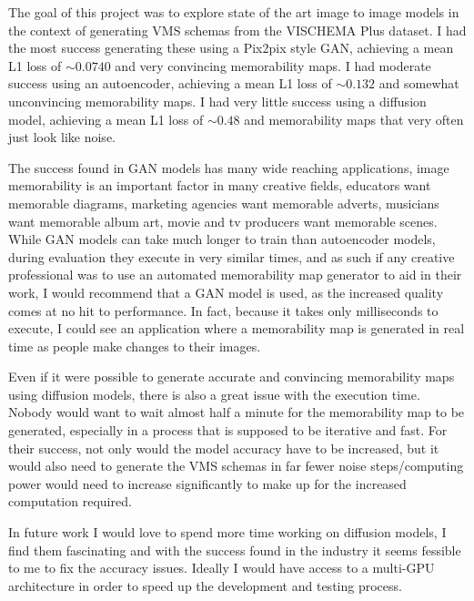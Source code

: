\documentclass{UoYCSproject}
\begin{document}

The goal of this project was to explore state of the art image to image models in the context of generating VMS schemas from the VISCHEMA Plus dataset. I had the most success generating these using a Pix2pix style GAN, achieving a mean L1 loss of \(\sim 0.0740 \) and very convincing memorability maps. I had moderate success using an autoencoder, achieving a mean L1 loss of \(\sim 0.132\) and somewhat unconvincing memorability maps. I had very little success using a diffusion model, achieving a mean L1 loss of \(\sim 0.48 \) and memorability maps that very often just look like noise.

The success found in GAN models has many wide reaching applications, image memorability is an important factor in many creative fields, educators want memorable diagrams, marketing agencies want memorable adverts, musicians want memorable album art, movie and tv producers want memorable scenes. While GAN models can take much longer to train than autoencoder models, during evaluation they execute in very similar times, and as such if any creative professional was to use an automated memorability map generator to aid in their work, I would recommend that a GAN model is used, as the increased quality comes at no hit to performance. In fact, because it takes only milliseconds to execute, I could see an application where a memorability map is generated in real time as people make changes to their images.

Even if it were possible to generate accurate and convincing memorability maps using diffusion models, there is also a great issue with the execution time. Nobody would want to wait almost half a minute for the memorability map to be generated, especially in a process that is supposed to be iterative and fast. For their success, not only would the model accuracy have to be increased, but it would also need to generate the VMS schemas in far fewer noise steps/computing power would need to increase significantly to make up for the increased computation required. 

In future work I would love to spend more time working on diffusion models, I find them fascinating and with the success found in the industry \cite{ramesh2022hierarchical, saharia2022photorealistic} it seems fessible to me to fix the accuracy issues. Ideally I would have access to a multi-GPU architecture in order to speed up the development and testing process.
\end{document}
